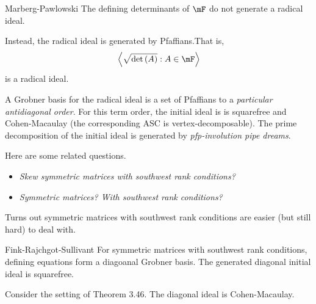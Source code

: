 \documentclass[co439]{subfiles}
\begin{document}
    \begin{theorem}{Marberg-Pawlowski}
        The defining determinants of $\mF$ do not generate a radical ideal.

        Instead, the radical ideal is generated by Pfaffians.\footnotemark[1] That is,
        \begin{equation*}
            \left< \sqrt{\det\left( A \right)}:A\in\mF \right> 
        \end{equation*}
        is a radical ideal. 

        A Grobner basis for the radical ideal is a set of Pfaffians to a \textit{particular antidiagonal order}. For this term order, the initial ideal is is squarefree and Cohen-Macaulay (the corresponding ASC is vertex-decomposable). The prime decomposition of the initial ideal is generated by \textit{pfp-involution pipe dreams}.
        
        \noindent
        \begin{minipage}{\textwidth}
        \end{minipage}
    \end{theorem}
    
    \rruleline
    
    \np Here are some related questions.
    \begin{itemize}
        \item \textit{Skew symmetric matrices with southwest rank conditions?}
        \item \textit{Symmetric matrices? With southwest rank conditions?}
    \end{itemize} 
    Turns out symmetric matrices with southwest rank conditions are easier (but still hard) to deal with.
    
    \begin{theorem}{Fink-Rajchgot-Sullivant}
        For symmetric matrices with southwest rank conditions, defining equations form a diagoanal Grobner basis. The generated diagonal initial ideal is squarefree.
    \end{theorem}

    \rruleline
    
    \begin{theorem}{}
        Consider the setting of Theorem 3.46. The diagonal ideal is Cohen-Macaulay.
    \end{theorem}
\end{document}
